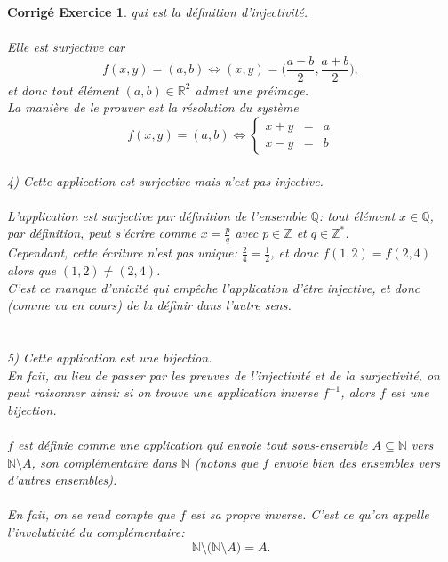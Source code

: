 \documentclass[11pt,french,table]{article}
\theoremstyle{exercice}
\theoremstyle{corrigé}
\newtheorem{corrigé}{Corrigé Exercice}
\begin{document}
\begin{corrigé}
qui est la définition d'injectivité. \\
\\
Elle est surjective car $$f(x,y) = (a,b) \iff (x,y) = \Big( \dfrac{a-b}{2}, \dfrac{a+b}{2} \Big),$$
et donc tout élément $(a,b) \in \mathbb{R}^2$ admet une préimage. \\
La manière de le prouver est la résolution du système
$$f(x,y) = (a,b) \iff
\left\{ \begin{array}{rcl}
     x+y &=& a \\
     x-y &=& b
\end{array} \right.$$
\hspace{1em} \\
4) Cette application est surjective mais n'est pas injective. \\
\\
L'application est surjective par définition de l'ensemble $\mathbb{Q}$: tout élément $x \in \mathbb{Q}$, par définition, peut s'écrire comme $x = \frac{p}{q}$ avec $p \in \mathbb{Z}$  et $q \in \mathbb{Z}^*$. \\
Cependant, cette écriture n'est pas unique: $\frac{2}{4} = \frac{1}{2}$, et donc $f(1,2) = f(2,4)$ alors que $(1,2) \neq (2,4)$. \\
C'est ce manque d'unicité qui empêche l'application d'être injective, et donc (comme vu en cours) de la définir dans l'autre sens. \\
\\
\\
5) Cette application est une bijection. \\
En fait, au lieu de passer par les preuves de l'injectivité et de la surjectivité, on peut raisonner ainsi: si on trouve une application inverse $f^{-1}$, alors $f$ est une bijection. \\
\\
$f$ est définie comme une application qui envoie tout sous-ensemble $A \subseteq \mathbb{N}$ vers $\mathbb{N} \setminus A$, son \textit{complémentaire dans $\mathbb{N}$} (notons que $f$ envoie bien des \textit{ensembles} vers d'autres \textit{ensembles}). \\ \\
En fait, on se rend compte que $f$ est sa propre inverse. C'est ce qu'on appelle l'\textit{involutivité du complémentaire}: $$\mathbb{N} \setminus \big( \mathbb{N} \setminus A \big) = A.$$

\end{corrigé}
\vspace{2em}
\end{document}
